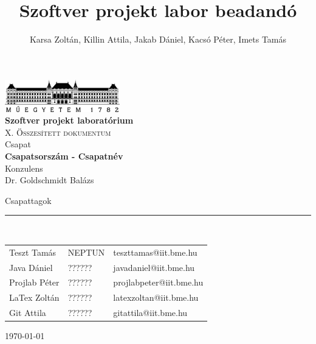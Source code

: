 \documentclass[12pt, a4paper]{book}
\title{Szoftver projekt labor beadandó}
\author{Karsa Zoltán, Killin Attila, Jakab Dániel, Kacsó Péter, Imets Tamás}
\begin{document}
\begin{titlepage} 
	\begin{center}
		\includegraphics[width=5cm]{docs/img/BMElogo}\\ 
		\vspace{1cm}
		\LARGE{\bfseries{Szoftver projekt laboratórium}}\\
		\vspace{0.5cm}
		\Large\textsc{X. Összesített dokumentum}\\
		\vspace{1cm}
		\small{Csapat}\\
		\Large{\bfseries{Csapatsorszám - Csapatnév}}\\
		\vspace{1cm}
		\small{Konzulens}\\
		\Large{Dr. Goldschmidt Balázs}
	\end{center}
	\begin{flushleft}
		\vspace*{6cm}
		Csapattagok\\
		\vspace{-0.3cm}
		\rule{14cm}{0.5pt}\\
		\vspace{0.2cm}
		\begin{tabular}{l l l} %
			Teszt Tamás & NEPTUN & teszttamas@iit.bme.hu \\
			Java Dániel & ?????? & javadaniel@iit.bme.hu \\
			Projlab Péter & ?????? & projlabpeter@iit.bme.hu \\
			LaTex Zoltán  & ?????? & latexzoltan@iit.bme.hu \\
			Git Attila & ?????? & gitattila@iit.bme.hu \\
		\end{tabular}
	\end{flushleft}
	\begin{flushright}
		\vspace*{2cm}
		\today   %
	\end{flushright}
\end{titlepage}

\sloppy

\end{document}
